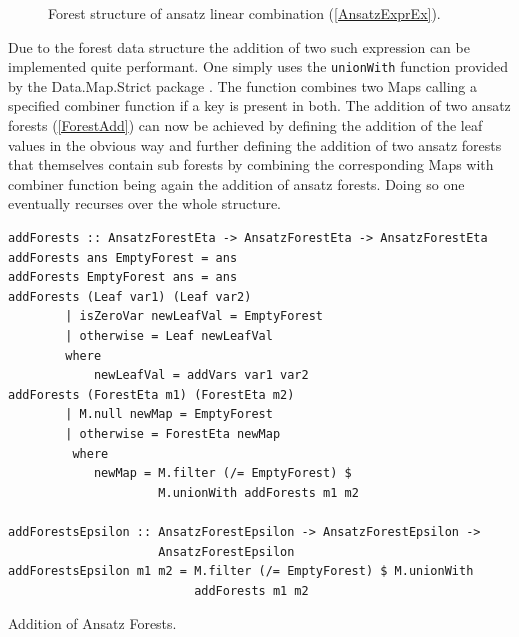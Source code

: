\documentclass[a4paper,12pt, DIV=14, BCOR=5mm, twoside, headsepline, numbers=noenddot]{scrbook}
\begin{document}
\begin{figure}
\caption{Forest structure of ansatz linear combination (\ref{AnsatzExprEx}). }
\label{AnsatzExprExForest}
\end{figure}

Due to the forest data structure the addition of two such expression can be implemented quite performant. One simply uses the \texttt{unionWith} function provided by the Data.Map.Strict package \cite{HackageMap}. The function combines two Maps calling a specified combiner function if a key is present in both. The addition of two ansatz forests (\ref{ForestAdd}) can now be achieved by defining the addition of the leaf values in the obvious way and further defining the addition of two ansatz forests that themselves contain sub forests by combining the corresponding Maps with combiner function being again the addition of ansatz forests. Doing so one eventually recurses over the whole structure. 
\begin{listing}[hbt!] 
\begin{verbatim}
addForests :: AnsatzForestEta -> AnsatzForestEta -> AnsatzForestEta
addForests ans EmptyForest = ans
addForests EmptyForest ans = ans
addForests (Leaf var1) (Leaf var2)
        | isZeroVar newLeafVal = EmptyForest
        | otherwise = Leaf newLeafVal
        where
            newLeafVal = addVars var1 var2
addForests (ForestEta m1) (ForestEta m2)
        | M.null newMap = EmptyForest
        | otherwise = ForestEta newMap
         where
            newMap = M.filter (/= EmptyForest) $
                     M.unionWith addForests m1 m2

addForestsEpsilon :: AnsatzForestEpsilon -> AnsatzForestEpsilon ->
                     AnsatzForestEpsilon
addForestsEpsilon m1 m2 = M.filter (/= EmptyForest) $ M.unionWith
                          addForests m1 m2
\end{verbatim} 
\caption{Addition of Ansatz Forests.}\label{ForestAdd}
\end{listing}\\
\end{document}
